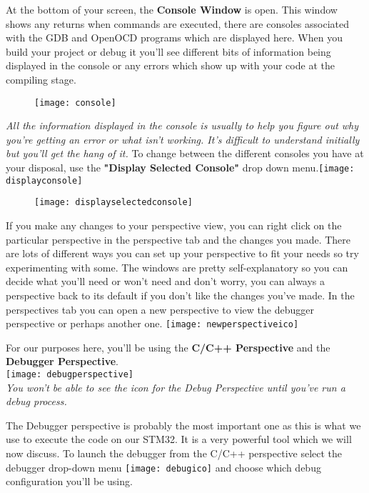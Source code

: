 {At the bottom of your screen, the \textbf{\color{Aquamarine} Console Window} is open. This window shows any returns when commands are executed, there are consoles associated with the GDB and OpenOCD programs which are displayed here. When you build your project or debug it you'll see different bits of information being displayed in the console or any errors which show up with your code at the compiling stage.
\begin{figure}[hbtp]
\centering
\texttt{[image: console]}
\end{figure}
\par
\emph{\color{Gray} All the information displayed in the console is usually to help you figure out why you're getting an error or what isn't working. It's difficult to understand initially but you'll get the hang of it.}
\newpage
To change between the different consoles you have at your disposal, use the \textbf{\color{Purple} "Display Selected Console"} drop down menu.\texttt{[image: displayconsole]}
\begin{figure}[htbp]
\centering
\texttt{[image: displayselectedconsole]}
\end{figure}
\par
If you make any changes to your perspective view, you can right click on the particular perspective in the perspective tab and \underline{} the changes you made.  There are lots of different ways you can set up your perspective to fit your needs so try experimenting with some. The windows are pretty self-explanatory so you can decide what you'll need or won't need and don't worry, you can always \underline{} a perspective back to its default if you don't like the changes you've made. 
In the perspectives tab you can open a new perspective to view the debugger perspective or perhaps another one. \texttt{[image: newperspectiveico]}
\par
For our purposes here, you'll be using the \textbf{C/C++ Perspective} and the \textbf{Debugger Perspective}.\\\texttt{[image: debugperspective]}\\
\emph{\color{Gray} You won't be able to see the icon for the Debug Perspective until you've run a debug process.}
\par  
The Debugger perspective is probably the most important one as this is what we use to execute the code on our STM32. It is a very powerful tool which we will now discuss. To launch the debugger from the C/C++ perspective select the debugger drop-down menu \texttt{[image: debugico]} and choose which debug configuration you'll be using.
}
